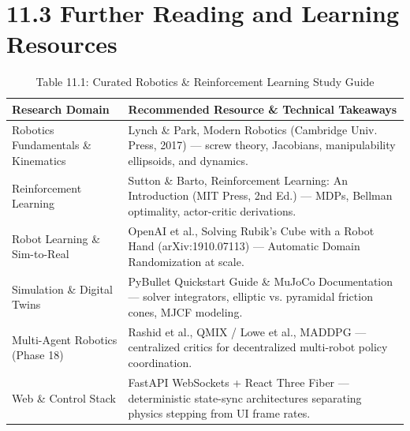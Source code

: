 \section{11.3 Further Reading and Learning Resources}
\begin{longtable}{l l}\caption{Table 11.1: Curated Robotics \& Reinforcement Learning Study Guide}\\\toprule
Research Domain & Recommended Resource \& Technical Takeaways \\ \midrule \endhead
Robotics Fundamentals \& Kinematics & Lynch \& Park, Modern Robotics (Cambridge Univ. Press, 2017) — screw theory, Jacobians, manipulability ellipsoids, and dynamics. \\
Reinforcement Learning & Sutton \& Barto, Reinforcement Learning: An Introduction (MIT Press, 2nd Ed.) — MDPs, Bellman optimality, actor-critic derivations. \\
Robot Learning \& Sim-to-Real & OpenAI et al., Solving Rubik's Cube with a Robot Hand (arXiv:1910.07113) — Automatic Domain Randomization at scale. \\
Simulation \& Digital Twins & PyBullet Quickstart Guide \& MuJoCo Documentation — solver integrators, elliptic vs. pyramidal friction cones, MJCF modeling. \\
Multi-Agent Robotics (Phase 18) & Rashid et al., QMIX / Lowe et al., MADDPG — centralized critics for decentralized multi-robot policy coordination. \\
Web \& Control Stack & FastAPI WebSockets + React Three Fiber — deterministic state-sync architectures separating physics stepping from UI frame rates. \\
\bottomrule \end{longtable}
